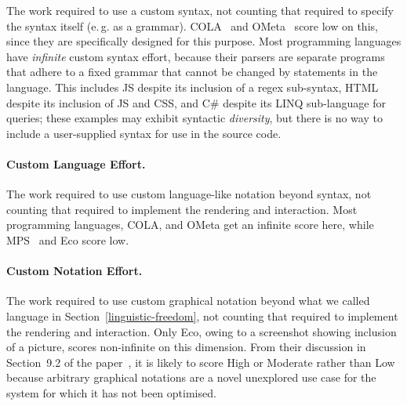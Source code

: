 \documentclass[ twoside,openright,titlepage,numbers=noenddot,headinclude,footinclude,cleardoublepage=empty,abstract=on,
                BCOR=5mm,paper=a4,fontsize=11pt
                ]{scrreprt}
\newcommand{\eg}{e.\,g.}
\theoremstyle{definition}
\begin{document}
The work required to use a custom syntax, not counting that required to
specify the syntax itself (\eg{} as a grammar).
\ac{COLA}~\parencite{COLAs} and OMeta~\parencite{OMeta} score low on
this, since they are specifically designed for this purpose. Most
programming languages have \emph{infinite} custom syntax effort, because
their parsers are separate programs that adhere to a fixed grammar that
cannot be changed by statements in the language. This includes \ac{JS}
despite its inclusion of a regex sub-syntax, HTML despite its inclusion
of \ac{JS} and CSS, and C\# despite its LINQ sub-language for queries;
these examples may exhibit syntactic \emph{diversity}, but there is no
way to include a user-supplied syntax for use in the source code.

\paragraph{Custom Language Effort.}

The work required to use custom language-like notation beyond syntax,
not counting that required to implement the rendering and interaction.
Most programming languages, \ac{COLA}, and OMeta get an infinite score
here, while MPS~\parencite{MPS} and Eco score low.

\paragraph{Custom Notation Effort.}

The work required to use custom graphical notation beyond what we called
language in Section~\ref{linguistic-freedom}, not counting that required
to implement the rendering and interaction. Only Eco, owing to a
screenshot showing inclusion of a picture, scores non-infinite on this
dimension. From their discussion in Section~9.2 of the
paper~\parencite{Eco}, it is likely to score High or Moderate rather
than Low because arbitrary graphical notations are a novel unexplored
use case for the system for which it has not been optimised.
\end{document}
